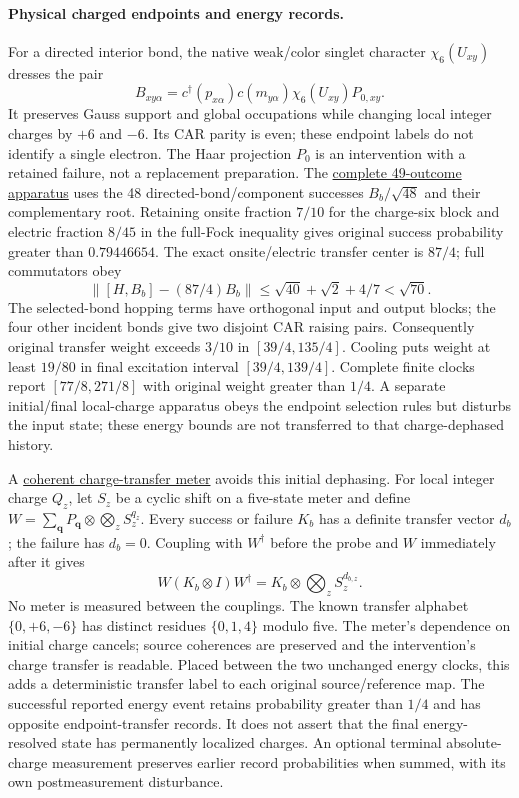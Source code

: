 \paragraph{Physical charged endpoints and energy records.}
For a directed interior bond, the native weak/color singlet character
$\chi_6(U_{xy})$ dresses the pair
\[
 B_{xy\alpha}=c^\dagger(p_{x\alpha})c(m_{y\alpha})
                         \chi_6(U_{xy})P_{0,xy}.
\]
It preserves Gauss support and global occupations while changing local
integer charges by $+6$ and $-6$. Its CAR parity is even; these endpoint
labels do not identify a single electron. The Haar projection $P_0$ is
an intervention with a retained failure, not a replacement preparation.
The \href{https://github.com/FloatingPragma/observer-patch-holography/blob/main/model/particle_primary_charged_string/PROOF.md}{complete 49-outcome apparatus}
uses the 48 directed-bond/component successes $B_b/\sqrt{48}$ and their
complementary root. Retaining onsite fraction $7/10$ for the charge-six
block and electric fraction $8/45$ in the full-Fock inequality gives
original success probability greater than $0.79446654$.
The exact onsite/electric transfer center is $87/4$; full commutators obey
\[
 \|[H,B_b]-(87/4)B_b\|
 \le\sqrt{40}+\sqrt2+4/7<\sqrt{70}.
\]
The selected-bond hopping terms have orthogonal input and output blocks;
the four other incident bonds give two disjoint CAR raising pairs.
Consequently original transfer weight exceeds $3/10$ in $[39/4,135/4]$.
Cooling puts weight at least $19/80$ in final excitation interval
$[39/4,139/4]$. Complete finite clocks report $[77/8,271/8]$ with original
weight greater than $1/4$. A separate initial/final local-charge apparatus
obeys the endpoint selection rules but disturbs the input state; these
energy bounds are not transferred to that charge-dephased history.

A \href{https://github.com/FloatingPragma/observer-patch-holography/blob/main/model/particle_primary_charged_readout/PROOF.md}{coherent charge-transfer meter}
avoids this initial dephasing. For local integer charge $Q_z$, let $S_z$
be a cyclic shift on a five-state meter and define
$W=\sum_{\mathbf q}P_{\mathbf q}\otimes\bigotimes_zS_z^{q_z}$.
Every success or failure $K_b$ has a definite transfer vector $d_b$;
the failure has $d_b=0$. Coupling with $W^\dagger$ before the probe and
$W$ immediately after it gives
\[
 W(K_b\otimes I)W^\dagger=K_b\otimes\bigotimes_z S_z^{d_{b,z}}.
\]
No meter is measured between the couplings. The known transfer alphabet
$\{0,+6,-6\}$ has distinct residues $\{0,1,4\}$ modulo five. The meter's
dependence on initial charge cancels; source coherences are preserved and
the intervention's charge transfer is readable. Placed between the two unchanged energy clocks,
this adds a deterministic transfer label to each original source/reference
map. The successful reported energy event retains probability greater
than $1/4$ and has opposite endpoint-transfer records. It does not assert
that the final energy-resolved state has permanently localized charges.
An optional terminal absolute-charge measurement preserves earlier record
probabilities when summed, with its own postmeasurement disturbance.

